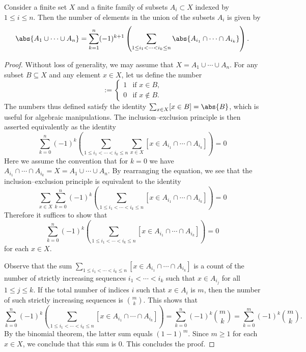 \begin{theorem}\label{theorem:inclusion-exclusion-principle}
  Consider a finite set $X$ and a finite family of subsets $A_i\subset X$ indexed by $1\leq i\leq n$. Then the number of elements in the union of the subsets $A_i$ is given by
  \begin{equation*}
    \abs{A_1\cup\cdots\cup A_n}=\sum_{k=1}^n (-1)^{k+1}\left(\sum_{1\leq i_1<\cdots<i_k\leq n}\abs{A_{i_1}\cap\cdots\cap A_{i_k}}\right).
  \end{equation*}
\end{theorem}

\begin{proof}
  Without loss of generality, we may assume that $X=A_1\cup\cdots\cup A_n$. For any subset $B\subseteq X$ and any element $x\in X$, let us define the number
  \begin{equation*}
    [x\in B] :=
    \begin{cases}
      1 & \text{if $x\in B$,} \\
      0 & \text{if $x\notin B$.}
    \end{cases}
  \end{equation*}
  The numbers thus defined satisfy the identity $\sum_{x\in X}[x\in B]=\abs{B}$, which is useful for algebraic manipulations. The inclusion--exclusion principle is then asserted equivalently as the identity
  \begin{equation*}
    \sum_{k=0}^n (-1)^{k}\left(\sum_{1\leq i_1<\cdots<i_k\leq n}\sum_{x\in X}[x\in A_{i_1}\cap\cdots\cap A_{i_k}]\right)=0
  \end{equation*}
  Here we assume the convention that for $k=0$ we have $A_{i_1}\cap\cdots\cap A_{i_k}=X=A_1\cup\cdots \cup A_n$. By rearranging the equation, we see that the inclusion--exclusion principle is equivalent to the identity
  \begin{equation*}
    \sum_{x\in X}\sum_{k=0}^n (-1)^{k}\left(\sum_{1\leq i_1<\cdots<i_k\leq n}[x\in A_{i_1}\cap\cdots\cap A_{i_k}]\right) = 0
  \end{equation*}
  Therefore it suffices to show that
  \begin{equation*}
    \sum_{k=0}^n (-1)^{k}\left(\sum_{1\leq i_1<\cdots<i_k\leq n}[x\in A_{i_1}\cap\cdots\cap A_{i_k}]\right) = 0
  \end{equation*}
  for each $x\in X$.
  
  Observe that the sum $\sum_{1\leq i_1<\cdots<i_k\leq n}[x\in A_{i_1}\cap\cdots\cap A_{i_k}]$ is a count of the number of strictly increasing sequences $i_1<\cdots <i_k$ such that $x\in A_{i_j}$ for all $1\leq j\leq k$. If the total number of indices $i$ such that $x\in A_i$ is $m$, then the number of such strictly increasing sequences is $\binom{m}{k}$. This shows that
  \begin{equation*}
    \sum_{k=0}^n (-1)^{k}\left(\sum_{1\leq i_1<\cdots<i_k\leq n}[x\in A_{i_1}\cap\cdots\cap A_{i_k}]\right) =
    \sum_{k=0}^n (-1)^{k}\binom{m}{k} =
    \sum_{k=0}^m (-1)^{k}\binom{m}{k}.
  \end{equation*}
  By the binomial theorem, the latter sum equals $(1-1)^m$. Since $m\geq 1$ for each $x\in X$, we conclude that this sum is $0$. This concludes the proof.
\end{proof}

